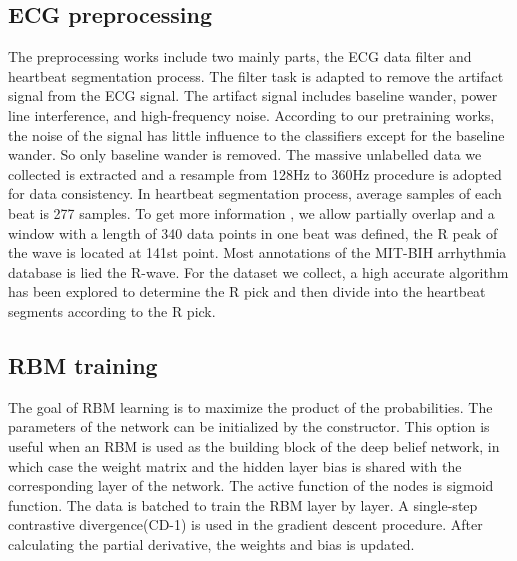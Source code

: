 \documentclass[conference]{IEEEtran}
\begin{document}
\subsection{ECG preprocessing}

The preprocessing works include two mainly parts, the ECG data filter and heartbeat segmentation process. The filter task is adapted to remove the artifact signal from the ECG signal. The artifact signal includes baseline wander, power line interference, and high-frequency noise. According to our pretraining works, the noise of the signal has little influence to the classifiers except for the baseline wander. So only baseline wander is removed. The massive unlabelled data we collected is extracted and a resample from 128Hz to 360Hz procedure is adopted for data consistency. In heartbeat segmentation process, average samples of each beat is 277 samples. To get more information , we allow partially overlap and a window with a length of 340 data points in one beat was defined, the R peak of the wave is located at 141st point. Most annotations of the MIT-BIH arrhythmia database is lied the R-wave. For the dataset we collect, a high accurate algorithm has been explored to determine the R pick and then divide into the heartbeat segments according to the R pick.

\subsection{RBM training}

The goal of RBM learning is to maximize the product of the probabilities. The parameters of the network can be initialized by the constructor. This option is useful when an RBM is used as the building block of the deep belief network, in which case the weight matrix and the hidden layer bias is shared with the corresponding layer of the network. The active function of the nodes is sigmoid function. The data is batched to train the RBM layer by layer. A single-step contrastive divergence(CD-1) is used in the gradient descent procedure. After calculating the partial derivative, the weights and bias is updated.
\end{document}
